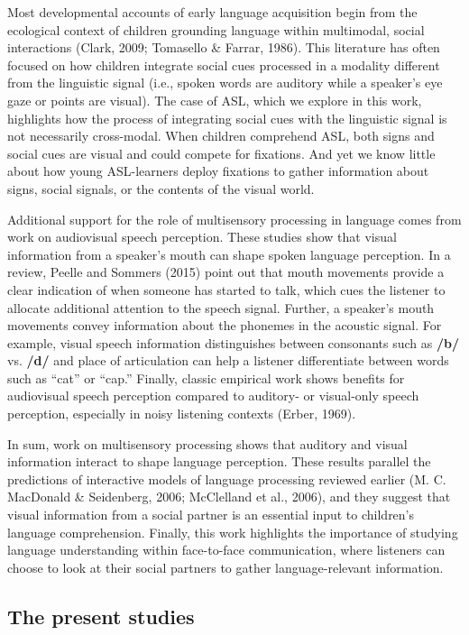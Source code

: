 \documentclass[,man,floatsintext]{apa6}
\begin{document}
Most developmental accounts of early language acquisition begin from the
ecological context of children grounding language within multimodal,
social interactions (Clark, 2009; Tomasello \& Farrar, 1986). This
literature has often focused on how children integrate social cues
processed in a modality different from the linguistic signal (i.e.,
spoken words are auditory while a speaker's eye gaze or points are
visual). The case of ASL, which we explore in this work, highlights how
the process of integrating social cues with the linguistic signal is not
necessarily cross-modal. When children comprehend ASL, both signs and
social cues are visual and could compete for fixations. And yet we know
little about how young ASL-learners deploy fixations to gather
information about signs, social signals, or the contents of the visual
world.

Additional support for the role of multisensory processing in language
comes from work on audiovisual speech perception. These studies show
that visual information from a speaker's mouth can shape spoken language
perception. In a review, Peelle and Sommers (2015) point out that mouth
movements provide a clear indication of when someone has started to
talk, which cues the listener to allocate additional attention to the
speech signal. Further, a speaker's mouth movements convey information
about the phonemes in the acoustic signal. For example, visual speech
information distinguishes between consonants such as \textbf{/b/} vs.
\textbf{/d/} and place of articulation can help a listener differentiate
between words such as \enquote{cat} or \enquote{cap.} Finally, classic
empirical work shows benefits for audiovisual speech perception compared
to auditory- or visual-only speech perception, especially in noisy
listening contexts (Erber, 1969).

In sum, work on multisensory processing shows that auditory and visual
information interact to shape language perception. These results
parallel the predictions of interactive models of language processing
reviewed earlier (M. C. MacDonald \& Seidenberg, 2006; McClelland et
al., 2006), and they suggest that visual information from a social
partner is an essential input to children's language comprehension.
Finally, this work highlights the importance of studying language
understanding within face-to-face communication, where listeners can
choose to look at their social partners to gather language-relevant
information.

\subsection{The present studies}\label{the-present-studies}
\end{document}
